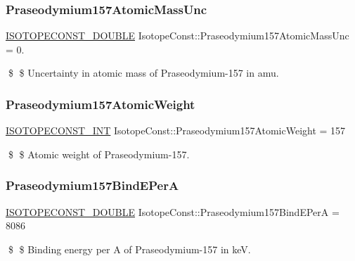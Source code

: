 \subsubsection{\texorpdfstring{Praseodymium157\+Atomic\+Mass\+Unc}{Praseodymium157AtomicMassUnc}}
{\footnotesize\ttfamily \mbox{\hyperlink{group___isotope_const-_macros_ga8f45a7272ce02c0b4c65c44636ed719a}{I\+S\+O\+T\+O\+P\+E\+C\+O\+N\+S\+T\+\_\+\+D\+O\+U\+B\+LE}} Isotope\+Const\+::\+Praseodymium157\+Atomic\+Mass\+Unc = 0.}

\$ \$ Uncertainty in atomic mass of Praseodymium-\/157 in amu. \mbox{\label{group___isotope_const-_praseodymium-_pr157_ga9c1c2c8e939c069738a68a961ae1eab7}} 
\subsubsection{\texorpdfstring{Praseodymium157\+Atomic\+Weight}{Praseodymium157AtomicWeight}}
{\footnotesize\ttfamily \mbox{\hyperlink{group___isotope_const-_macros_ga5f18360b3e99483a35c32d789e62621c}{I\+S\+O\+T\+O\+P\+E\+C\+O\+N\+S\+T\+\_\+\+I\+NT}} Isotope\+Const\+::\+Praseodymium157\+Atomic\+Weight = 157}

\$ \$ Atomic weight of Praseodymium-\/157. \mbox{\label{group___isotope_const-_praseodymium-_pr157_ga1ef342556169039d87dc2076ec0fbe32}} 
\subsubsection{\texorpdfstring{Praseodymium157\+Bind\+E\+PerA}{Praseodymium157BindEPerA}}
{\footnotesize\ttfamily \mbox{\hyperlink{group___isotope_const-_macros_ga8f45a7272ce02c0b4c65c44636ed719a}{I\+S\+O\+T\+O\+P\+E\+C\+O\+N\+S\+T\+\_\+\+D\+O\+U\+B\+LE}} Isotope\+Const\+::\+Praseodymium157\+Bind\+E\+PerA = 8086}

\$ \$ Binding energy per A of Praseodymium-\/157 in keV. \mbox{\label{group___isotope_const-_praseodymium-_pr157_gae52fe54337c9877a11a6534b51761e93}} 
